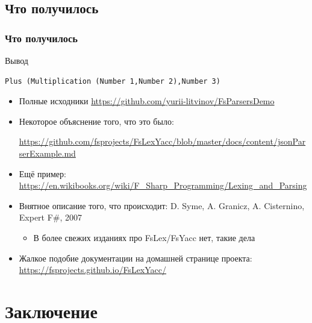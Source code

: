\documentclass[xetex,mathserif,serif]{beamer}
\begin{document}
    \subsection{Что получилось}

    \begin{frame}[fragile]
        \frametitle{Что получилось}
        \begin{exampleblock}{Вывод}
            \begin{verbatim}
Plus (Multiplication (Number 1,Number 2),Number 3)
            \end{verbatim}
        \end{exampleblock}
        \begin{itemize}
            \item Полные исходники \url{https://github.com/yurii-litvinov/FsParsersDemo}
            \item Некоторое объяснение того, что это было:
            
                \url{https://github.com/fsprojects/FsLexYacc/blob/master/docs/content/jsonParserExample.md}
            \item Ещё пример: \url{https://en.wikibooks.org/wiki/F_Sharp_Programming/Lexing_and_Parsing}
            \item Внятное описание того, что происходит: D. Syme, A. Granicz, A. Cisternino, Expert F\#, 2007
            \begin{itemize}
                \item В более свежих изданиях про FsLex/FsYacc нет, такие дела
            \end{itemize}
            \item Жалкое подобие документации на домашней странице проекта: \url{https://fsprojects.github.io/FsLexYacc/}
        \end{itemize}
    \end{frame}

    \section{Заключение}
\end{document}
